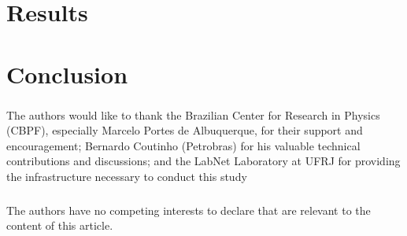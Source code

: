 \documentclass[runningheads]{llncs}
\begin{document}
\subsection{}





\section{Results}
\label{sec:results}



\section{Conclusion}
\label{sec:conclusion}



\begin{credits}

\subsubsection{\ackname}

The authors would like to thank the Brazilian Center for Research in Physics (CBPF), especially Marcelo Portes de Albuquerque, for their support and encouragement; Bernardo Coutinho (Petrobras) for his valuable technical contributions and discussions; and the LabNet Laboratory at UFRJ for providing the infrastructure necessary to conduct this study

\subsubsection{\discintname}
The authors have no competing interests to declare that are relevant to the
content of this article.
\end{credits}
\end{document}
